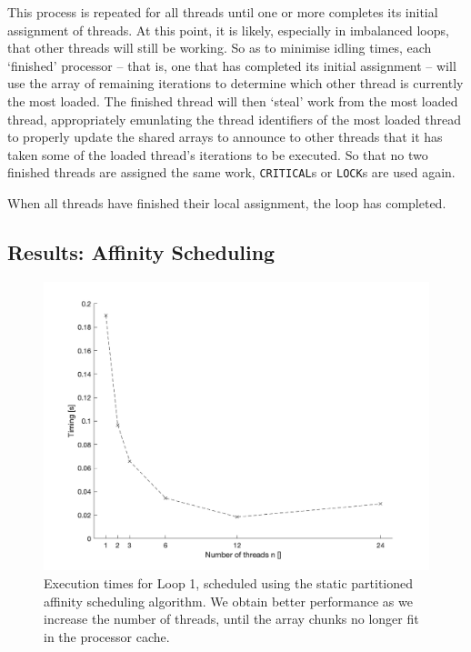 \documentclass{article} %
\newcommand{\tp}{\texttt}
\begin{document}
This process is repeated for all threads until one or more completes its initial assignment of threads.
At this point, it is likely, especially in imbalanced loops, that other threads will still be working.
So as to minimise idling times, each `finished' processor -- that is, one that has completed its initial assignment -- will use the array of remaining iterations to determine which other thread is currently the most loaded.
The finished thread will then `steal' work from the most loaded thread, appropriately emunlating the thread identifiers of the most loaded thread to properly update the shared arrays to announce to other threads that it has taken some of the loaded thread's iterations to be executed.
So that no two finished threads are assigned the same work, \tp{CRITICAL}s or \tp{LOCK}s are used again.

When all threads have finished their local assignment, the loop has completed.

\subsection*{Results: Affinity Scheduling}

\begin{figure}
    \centering
    \includegraphics[width=.8\textwidth]{part2_plots/affinity_loop1}
    \caption{Execution times for Loop 1, scheduled using the static partitioned affinity scheduling algorithm. We obtain better performance as we increase the number of threads, until the array chunks no longer fit in the processor cache.}
    \label{fig:affinityloop1}
\end{figure}
\end{document}
